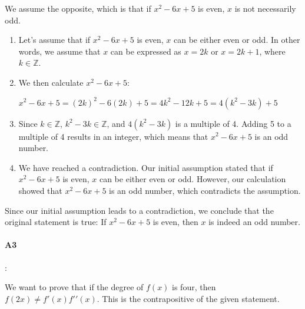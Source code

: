 \documentclass{article}
\begin{document}
We assume the opposite, which is that if $x^2 - 6x + 5$ is even, $x$ is not necessarily odd.

\begin{enumerate}
  \item Let's assume that if $x^2 - 6x + 5$ is even, $x$ can be either even or odd. In other words, we assume that $x$ can be expressed as $x = 2k$ or $x = 2k + 1$, where $k \in \mathbb{Z}$.
  \item We then calculate $x^2 - 6x + 5$:
  
$x^2 - 6x + 5 = (2k)^2 - 6(2k) + 5 = 4k^2 - 12k + 5 = 4(k^2 - 3k) + 5$
  \item Since $k \in \mathbb{Z}$, $k^2 - 3k \in \mathbb{Z}$, and $4(k^2 - 3k)$ is a multiple of 4. Adding 5 to a multiple of 4 results in an integer, which means that $x^2 - 6x + 5$ is an odd number.
  \item We have reached a contradiction. Our initial assumption stated that if $x^2 - 6x + 5$ is even, $x$ can be either even or odd. However, our calculation showed that $x^2 - 6x + 5$ is an odd number, which contradicts the assumption.
\end{enumerate}

Since our initial assumption leads to a contradiction, we conclude that the original statement is true: If $x^2 - 6x + 5$ is even, then $x$ is indeed an odd number.

\paragraph{A3}:


We want to prove that if the degree of $f(x)$ is four, then $f(2x) \neq f \prime(x)f \prime \prime(x)$. This is the contrapositive of the given statement.
\end{document}
